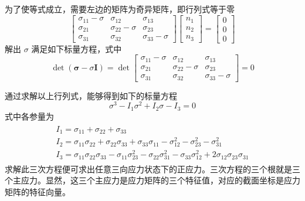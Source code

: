 \documentclass[12pt, a4paper]{ctexart}
\begin{document}
为了使等式成立，需要左边的矩阵为奇异矩阵，即行列式等于零
\begin{equation}
\left[ \begin{array}{ccc}{\sigma_{11}-\sigma} & {\sigma_{12}} & {\sigma_{13}} \\ {\sigma_{21}} & {\sigma_{22}-\sigma} & {\sigma_{23}} \\ {\sigma_{31}} & {\sigma_{32}} & {\sigma_{33}-\sigma}\end{array}\right] \left[ \begin{array}{l}{n_{1}} \\ {n_{2}} \\ {n_{3}}\end{array}\right]=\left[ \begin{array}{l}{0} \\ {0} \\ {0}\end{array}\right]
\end{equation}
解出 $ \sigma $ 满足如下标量方程，式中
\begin{equation}
\operatorname{det}(\boldsymbol{\sigma}-\sigma \mathbf{I})=\operatorname{det} \left[ \begin{array}{ccc}{\sigma_{11}-\sigma} & {\sigma_{12}} & {\sigma_{13}} \\ {\sigma_{21}} & {\sigma_{22}-\sigma} & {\sigma_{23}} \\ {\sigma_{31}} & {\sigma_{32}} & {\sigma_{33}-\sigma}\end{array}\right]=0
\end{equation}

通过求解以上行列式，能够得到如下的标量方程
\begin{equation}
\sigma^{3}-I_{1} \sigma^{2}+I_{2} \sigma-I_{3}=0
\end{equation}
式中各参量为
\begin{gather}
\begin{array}{c}{I_{1}=\sigma_{11}+\sigma_{22}+\sigma_{33}} \\ {I_{2}=\sigma_{11} \sigma_{22}+\sigma_{22} \sigma_{33}+\sigma_{33} \sigma_{11}-\sigma_{12}^{2}-\sigma_{23}^{2}-\sigma_{31}^{2}} \\ {I_{3}=\sigma_{11} \sigma_{22} \sigma_{33}-\sigma_{11} \sigma_{23}^{2}-\sigma_{22} \sigma_{31}^{2}-\sigma_{33} \sigma_{12}^{2}+2 \sigma_{12} \sigma_{23} \sigma_{31}}\end{array}
\end{gather}
求解此三次方程便可求出任意三向应力状态下的正应力。三次方程的三个根就是三个主应力。显然，这三个主应力是应力矩阵的三个特征值，对应的截面坐标是应力矩阵的特征向量。

\end{document}
